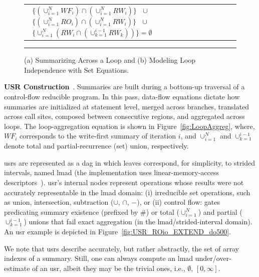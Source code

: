 \documentclass{sig-alternate}
\begin{document}
\begin{figure}[t]
\begin{tabular}{l r}
{{{{$\mbox{ }\{(\cup_{i=1}^{N}WF_i) \cap (\cup_{i=1}^{N}RW_i)\} \mbox{ }\cup\mbox{ }$ \vspace{1ex} \newline
$\mbox{ }\{(\cup_{i=1}^{N}RO_i) \cap (\cup_{i=1}^{N}RW_i)\} \mbox{ }\cup\mbox{ }$ \vspace{1ex} \newline
$\mbox{ }\{ \cup_{i=1}^{N}(RW_i \cap (\cup_{k=1}^{i-1}RW_k))\}=\emptyset$ \newline
}
		}
	  } 
	} 
\end{tabular}
\hrule
\caption{ (a) Summarizing Across a Loop and (b) Modeling Loop Independence with Set Equations.}
\label{fig:UsrEq} %
\end{figure}

\vspace{1ex}

\enlargethispage{\baselineskip}

{\bf USR Construction}~\cite{HybAn}.
Summaries are built during a bottom-up 
traversal of a control-flow reducible program.
%
In this pass, data-flow equations dictate how summaries are 
initialized at statement level, merged across branches, 
translated across call sites, composed between consecutive regions, 
and aggregated across loops. The loop-aggregation equation is shown in
Figure~\ref{fig:LoopAggreg}, where, $WF_i$ corresponds to the 
write-first summary of iteration $i$, and 
$\cup_{i=1}^N$ and $\cup_{k=1}^{i-1}$ denote total and 
partial-recurrence (set) union, respectively. 

{\sc usr}s are represented as a {\sc dag} in which leaves correspond,
for simplicity, to strided intervals, named {\sc lmad} (the implementation 
uses linear-memory-access descriptors~\cite{LMAD}).
{\sc usr}'s internal nodes represent operations whose results were not
accurately representable in the {\sc lmad} domain: (i) irreducible set
operations, such as union, intersection, subtraction ($\cup$, $\cap$, $-$), 
or (ii) control flow: gates predicating
summary existence (prefixed by $\#$) or total ($\cup_{i=1}^N$) and partial 
($\cup_{k=1}^{i-1}$) unions that fail exact aggregation (in the {\sc lmad}/strided-interval domain).
An {\sc usr} example is depicted in Figure~\ref{fig:USR_ROio_EXTEND_do500}.

We note that {\sc usr}s describe accurately, but rather abstractly, the 
set of array indexes of a summary.  Still, one can 
always compute an {\sc lmad} under/over-estimate of an {\sc usr}, albeit 
they may be the trivial ones, i.e., $\emptyset$, $[0,\infty]$. 
\end{document}
